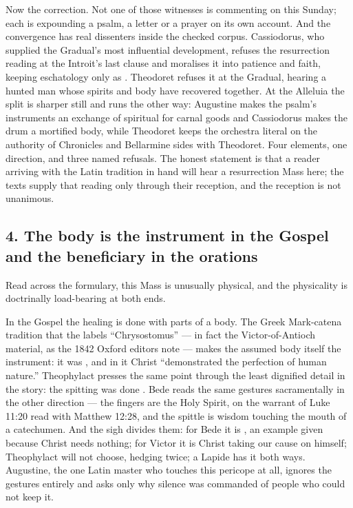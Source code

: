 Now the correction. Not one of those witnesses is commenting on this Sunday;
each is expounding a psalm, a letter or a prayer on its own account. And the
convergence has real dissenters inside the checked corpus. Cassiodorus, who
supplied the Gradual's most influential development, refuses the resurrection
reading at the Introit's last clause and moralises it into patience and faith,
keeping eschatology only as . Theodoret refuses it at the
Gradual, hearing a hunted man whose spirits and body have recovered together.
At the Alleluia the split is sharper still and runs the other way: Augustine
makes the psalm's instruments an exchange of spiritual for carnal goods and
Cassiodorus makes the drum a mortified body, while Theodoret keeps the
orchestra literal on the authority of Chronicles and Bellarmine sides with
Theodoret. Four elements, one direction, and three named refusals. The honest
statement is that a reader arriving with the Latin tradition in hand will hear
a resurrection Mass here; the texts supply that reading only through their
reception, and the reception is not unanimous.

\subsection*{4. The body is the instrument in the Gospel and the beneficiary in the orations}

Read across the formulary, this Mass is unusually physical, and the physicality
is doctrinally load-bearing at both ends.

In the Gospel the healing is done with parts of a body. The Greek Mark-catena
tradition that the  labels ``Chrysostomus'' --- in fact the
Victor-of-Antioch material, as the 1842 Oxford editors note --- makes the
assumed body itself the instrument: it was , and in it Christ ``demonstrated the perfection
of human nature.'' Theophylact presses the same point through the least dignified
detail in the story: the spitting was done . Bede reads the same gestures
sacramentally in the other direction --- the fingers are the Holy Spirit, on the
warrant of Luke 11:20 read with Matthew 12:28, and the spittle is wisdom
touching the mouth of a catechumen. And the sigh divides them: for Bede it is
, an example given because Christ needs nothing; for
Victor it is Christ taking our cause on himself; Theophylact will not choose,
hedging twice; a Lapide has it both ways. Augustine, the one Latin master who
touches this pericope at all, ignores the gestures entirely and asks only why
silence was commanded of people who could not keep it.

